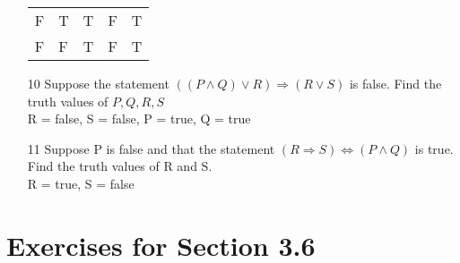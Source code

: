 \documentclass[12pt]{article}
\begin{document}
\begin{enumerate}
\begin{tabular}{l|l|c|c|c}
		F & T & T     & F         & T \\
		F & F & T     & F         & T \\
		\hline
	    \end{tabular}
	\item [10] Suppose the statement $((P\land Q) \lor R)\Rightarrow (R \lor S)$ is false. Find the truth values of $P,Q,R,S$\\
	    R = false, S = false, P = true, Q = true
	\item [11] Suppose P is false and that the statement $(R\Rightarrow S) \Leftrightarrow (P \land Q)$ is true. Find the truth values of R and S.\\
	    R = true, S = false
\end{enumerate}
\section*{Exercises for Section 3.6}
\end{document}
